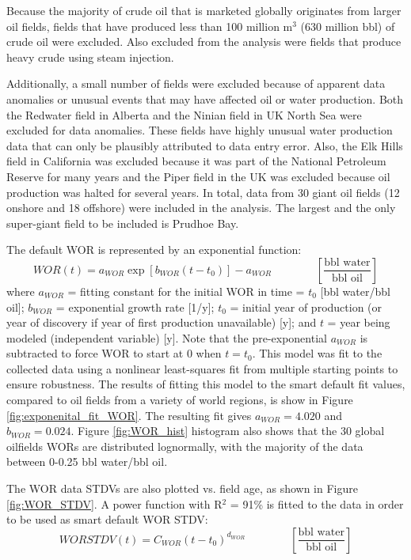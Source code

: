 \documentclass[11pt]{report}
\newcommand{\eqnunitfrac}[2]{\quad\quad \scriptstyle{\left[\frac{\text{#1}}{\text{#2}}\right]}}
\begin{document}
Because the majority of crude oil that is marketed globally originates from larger oil fields, fields that have produced less than 100 million m$^3$ (630 million bbl) of crude oil were excluded. Also excluded from the analysis were fields that produce heavy crude using steam injection. 

Additionally, a small number of fields were excluded because of apparent data anomalies or unusual events that may have affected oil or water production. Both the Redwater field in Alberta and the Ninian field in UK North Sea were excluded for data anomalies. These fields have highly unusual water production data that can only be plausibly attributed to data entry error. Also, the Elk Hills field in California was excluded because it was part of the National Petroleum Reserve for many years and the Piper field in the UK was excluded because oil production was halted for several years. In total, data from 30 giant oil fields (12 onshore and 18 offshore) were included in the analysis. The largest and the only super-giant field to be included is Prudhoe Bay.


The default WOR is represented by an exponential function:
\begin{equation}\label{eq:smart_default_WOR}
WOR(t) = a_{WOR} \exp [b_{WOR} ( t - t_0 )] - a_{WOR} \quad\quad\eqnunitfrac{bbl water}{bbl oil}
\end{equation}
where $a_{WOR}$ = fitting constant for the initial WOR in time = $t_0$ [bbl water/bbl oil]; $b_{WOR}$ = exponential growth rate [1/y]; $t_0$ = initial year of production (or year of discovery if year of first production unavailable) [y]; and $t$ = year being modeled (independent variable) [y]. Note that the pre-exponential $a_{WOR}$ is subtracted to force WOR to start at 0 when $t = t_0$. This model was fit to the collected data using a nonlinear least-squares fit from multiple starting points to ensure robustness.
The results of fitting this model to the smart default fit values, compared to oil fields from a variety of world regions, is show in Figure \ref{fig:exponenital_fit_WOR}. The resulting fit gives $a_{WOR} = 4.020$ and $b_{WOR} = 0.024$. Figure \ref{fig:WOR_hist} histogram also shows that the 30 global oilfields WORs are distributed lognormally, with the majority of the data between 0-0.25 bbl water/bbl oil. 

The WOR data STDVs are also plotted vs. field age, as shown in Figure \ref{fig:WOR_STDV}. A power function with R$^2$ = 91\% is fitted to the data in order to be used as smart default WOR STDV:
\begin{equation}\label{eq:smart_default_WOR_STDV}
WOR STDV(t) = C_{WOR}( t - t_0 )^{d_{WOR}} \quad\quad\eqnunitfrac{bbl water}{bbl oil}
\end{equation}
\end{document}
